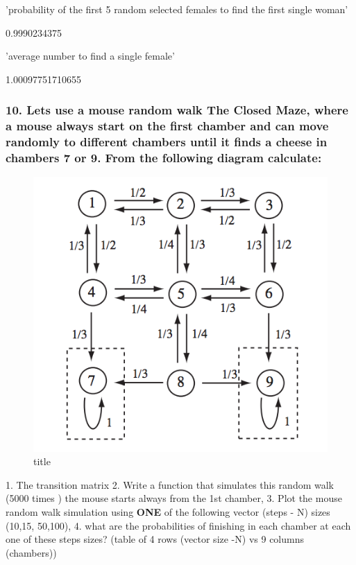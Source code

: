 \documentclass[11pt]{article}
\makeatletter
\def\maxwidth{\ifdim\Gin@nat@width>\linewidth\linewidth
    \else\Gin@nat@width\fi}
\let\Oldincludegraphics\includegraphics
\renewcommand{\includegraphics}[1]{\Oldincludegraphics[width=.8\maxwidth]{#1}}
\makeatother
\begin{document}
    'probability of the first 5 random selected females to find the first single woman'

    
    0.9990234375

    
    'average number to find a single female'

    
    1.00097751710655

    
    \hypertarget{lets-use-a-mouse-random-walk-the-closed-maze-where-a-mouse-always-start-on-the-first-chamber-and-can-move-randomly-to-different-chambers-until-it-finds-a-cheese-in-chambers-7-or-9.-from-the-following-diagram-calculate}{%
\subsubsection{10. Lets use a mouse random walk The Closed Maze, where a
mouse always start on the first chamber and can move randomly to
different chambers until it finds a cheese in chambers 7 or 9. From the
following diagram
calculate:}\label{lets-use-a-mouse-random-walk-the-closed-maze-where-a-mouse-always-start-on-the-first-chamber-and-can-move-randomly-to-different-chambers-until-it-finds-a-cheese-in-chambers-7-or-9.-from-the-following-diagram-calculate}}

\begin{figure}
\centering
\includegraphics{Mouse_random.png}
\caption{title}
\end{figure}

 1. The transition matrix 2. Write a function that simulates this random
walk (5000 times ) the mouse starts always from the 1st chamber, 3. Plot
the mouse random walk simulation using \textbf{ONE} of the following
vector (steps - N) sizes (10,15, 50,100), 4. what are the probabilities
of finishing in each chamber at each one of these steps sizes? (table of
4 rows (vector size -N) vs 9 columns (chambers))
\end{document}
